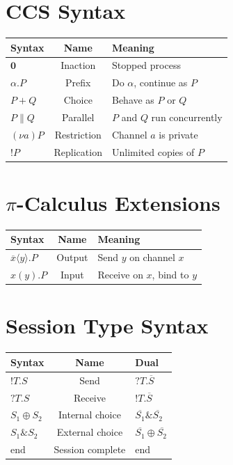 \documentclass[11pt, a4paper, oneside]{book}
\newcommand{\nil}{\mathbf{0}}
\newcommand{\Par}{\mathbin{\|}}
\newcommand{\res}[1]{(\nu #1)}
\newcommand{\inp}[2]{#1(#2)}
\newcommand{\outp}[2]{\overline{#1}\langle #2 \rangle}
\begin{document}
\section*{CCS Syntax}

\begin{center}
\begin{tabular}{lcl}
  \toprule
  \textbf{Syntax} & \textbf{Name} & \textbf{Meaning} \\
  \midrule
  $\nil$ & Inaction & Stopped process \\
  $\alpha.P$ & Prefix & Do $\alpha$, continue as $P$ \\
  $P + Q$ & Choice & Behave as $P$ or $Q$ \\
  $P \Par Q$ & Parallel & $P$ and $Q$ run concurrently \\
  $\res{a}P$ & Restriction & Channel $a$ is private \\
  $!P$ & Replication & Unlimited copies of $P$ \\
  \bottomrule
\end{tabular}
\end{center}

\section*{$\pi$-Calculus Extensions}

\begin{center}
\begin{tabular}{lcl}
  \toprule
  \textbf{Syntax} & \textbf{Name} & \textbf{Meaning} \\
  \midrule
  $\outp{x}{y}.P$ & Output & Send $y$ on channel $x$ \\
  $\inp{x}{y}.P$ & Input & Receive on $x$, bind to $y$ \\
  \bottomrule
\end{tabular}
\end{center}

\section*{Session Type Syntax}

\begin{center}
\begin{tabular}{lcl}
  \toprule
  \textbf{Syntax} & \textbf{Name} & \textbf{Dual} \\
  \midrule
  $!T.S$ & Send & $?T.\overline{S}$ \\
  $?T.S$ & Receive & $!T.\overline{S}$ \\
  $S_1 \oplus S_2$ & Internal choice & $\overline{S_1} \mathbin{\&} \overline{S_2}$ \\
  $S_1 \mathbin{\&} S_2$ & External choice & $\overline{S_1} \oplus \overline{S_2}$ \\
  $\text{end}$ & Session complete & $\text{end}$ \\
  \bottomrule
\end{tabular}
\end{center}
\end{document}
